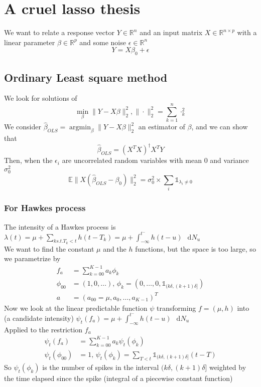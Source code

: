 \documentclass{report}
\newcommand{\dd}{\mathop{}\,\mathrm{d}}
\DeclareMathOperator\argmin{argmin}
\begin{document}
	\chapter{A cruel lasso thesis}
		We want to relate a response vector $Y\in\mathbb{R}^n$ and an input matrix $X\in\mathbb{R}^{n\times p}$ with a linear parameter $\beta\in\mathbb{R}^p$ and some noise $\epsilon\in\mathbb{R}^n$ \[Y=X\beta_0+\epsilon\]
		\section{Ordinary Least square method}
			We look for solutions of \[\min_{\beta}\|Y-X\beta\|_2^2, \|\cdot\|_2^2=\sum_{k=1}^n\cdot_k^2\]
			We consider $\widehat{\beta}_{OLS}=\argmin_{\beta}\|Y-X\beta\|_2^2$ an estimator of $\beta$, and we can show that \[\widehat{\beta}_{OLS}=(X^TX)^\dagger X^TY\]
			Then, when the $\epsilon_i$ are uncorrelated random variables with mean 0 and variance $\sigma_0^2$ \[\mathbb{E}\|X(\widehat{\beta}_{OLS}-\beta_0)\|_2^2=\sigma_0^2\times\sum_i\mathds1_{\lambda_i\neq0}\]

			\subsection{For Hawkes process}
				The intensity of a Hawkes process is $\lambda(t)=\mu+\sum_{k s.t. T_k<t}h(t-T_k)=\mu+\int_{-\infty}^{t^-}h(t-u)\dd N_u$\\
				We want to find the constant $\mu$ and the $h$ functions, but the space is too large, so we parametrize by \begin{align}
					f_a&=\sum_{k=00}^{K-1}a_k\phi_k\\
					\phi_{00}&=(1,0,\dots),\,\phi_k=(0,\dots,0,\mathds1_{(k\delta,(k+1)\delta]})\\
					a&=(a_{00}=\mu,a_0,\dots,a_{K-1})^T
				\end{align}
				Now we look at the linear predictable function $\psi$ transforming $f=(\mu,h)$ into (a candidate intensity) $\psi_t(f_a)=\mu+\int_{-\infty}^{t^-}h(t-u)\dd N_u$\\
				Applied to the restriction $f_a$ \begin{align}
					\psi_t(f_a)&=\sum_{k=00}^{K-1}a_k\psi_t(\phi_k)\\
					\psi_t(\phi_{00})&=1,\,\psi_t(\phi_k)=\sum_{T<t}\mathds1_{(k\delta,(k+1)\delta]}(t-T)
				\end{align}
				So $\psi_t(\phi_k)$ is the number of spikes in the interval $(k\delta,(k+1)\delta]$ weighted by the time elapsed since the spike (integral of a piecewise constant function)\\
\end{document}
